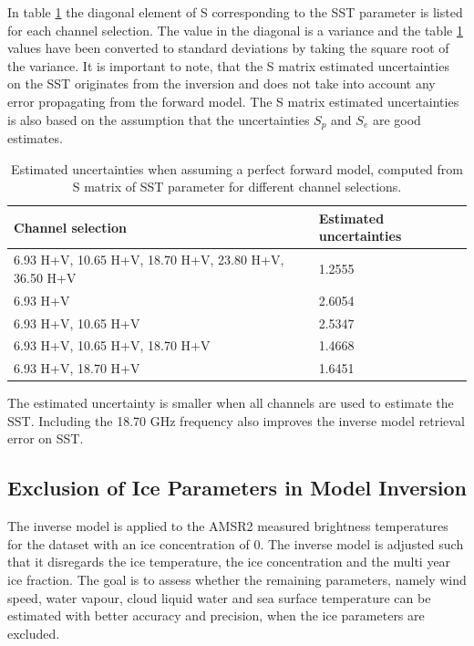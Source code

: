 \documentclass[11pt, a4paper]{article}
\begin{document}
In table \ref{tab:task3b_2} the diagonal element of S corresponding to the SST parameter is listed for each channel selection. The value in the diagonal is a variance and the table \ref{tab:task3b_2} values have been converted to standard deviations by taking the square root of the variance. It is important to note, that the S matrix estimated uncertainties on the SST originates from the inversion and does not take into account any error propagating from the forward model. The S matrix estimated uncertainties is also based on the assumption that the uncertainties \(S_p\) and \(S_e\) are good estimates. 

\begin{table}[h!]
	\centering
	\begin{tabular}{@{}p{11cm}p{4cm}@{}}
		Channel selection & Estimated uncertainties 
		\tabularnewline
		\midrule
		6.93 H+V, 10.65 H+V, 18.70 H+V, 23.80 H+V, 36.50 H+V & 1.2555	\\
		6.93 H+V	& 2.6054	\\
		6.93 H+V, 10.65 H+V	& 2.5347	\\
		6.93 H+V, 10.65 H+V, 18.70 H+V	& 1.4668		\\
		6.93 H+V, 18.70 H+V	& 1.6451	\\
		\midrule
	\end{tabular}
	\caption{Estimated uncertainties when assuming a perfect forward model, computed from S matrix of SST parameter for different channel selections.}
	\label{tab:task3b_2}
\end{table}

The estimated uncertainty is smaller when all channels are used to estimate the SST. Including the 18.70 GHz frequency also improves the inverse model retrieval error on SST.

\subsection{Exclusion of Ice Parameters in Model Inversion}
The inverse model is applied to the AMSR2 measured brightness temperatures for the dataset with an ice concentration of 0. The inverse model is adjusted such that it disregards the ice temperature, the ice concentration and the multi year ice fraction. The goal is to assess whether the remaining parameters, namely wind speed, water vapour, cloud liquid water and sea surface temperature can be estimated with better accuracy and precision, when the ice parameters are excluded.   
\end{document}
